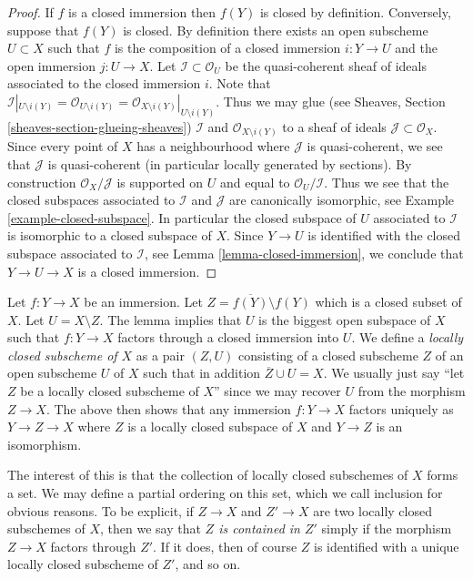 \begin{proof}
If $f$ is a closed immersion then $f(Y)$ is closed by definition.
Conversely, suppose that $f(Y)$ is closed. By definition
there exists an open subscheme $U \subset X$ such that $f$ is the composition
of a closed immersion $i : Y \to U$ and the open immersion
$j : U \to X$. Let $\mathcal{I} \subset \mathcal{O}_U$ be the
quasi-coherent sheaf of ideals associated to the closed immersion
$i$. Note that
$\mathcal{I}|_{U \setminus i(Y)}
= \mathcal{O}_{U \setminus i(Y)}
= \mathcal{O}_{X \setminus i(Y)}|_{U \setminus i(Y)}$.
Thus we may glue (see Sheaves, Section \ref{sheaves-section-glueing-sheaves})
$\mathcal{I}$ and $\mathcal{O}_{X \setminus i(Y)}$ to a sheaf of
ideals $\mathcal{J} \subset \mathcal{O}_X$. Since every
point of $X$ has a neighbourhood where $\mathcal{J}$ is
quasi-coherent, we see that $\mathcal{J}$ is quasi-coherent
(in particular locally generated by sections).
By construction $\mathcal{O}_X/\mathcal{J}$ is supported
on $U$ and equal to $\mathcal{O}_U/\mathcal{I}$.
Thus we see that the closed subspaces associated to $\mathcal{I}$
and $\mathcal{J}$ are canonically isomorphic, see
Example \ref{example-closed-subspace}.
In particular the closed subspace of $U$ associated to $\mathcal{I}$
is isomorphic to a closed subspace of $X$.
Since $Y \to U$ is identified with the closed subspace
associated to $\mathcal{I}$, see Lemma \ref{lemma-closed-immersion},
we conclude that $Y \to U \to X$
is a closed immersion.
\end{proof}

\noindent
Let $f : Y \to X$ be an immersion.
Let $Z = \overline{f(Y)} \setminus f(Y)$ which is a closed subset of $X$.
Let $U = X \setminus Z$.
The lemma implies that $U$ is the biggest open subspace of $X$
such that $f : Y \to X$ factors through a closed immersion into $U$.
We define a {\it locally closed subscheme of $X$} as a pair
$(Z, U)$ consisting of a closed subscheme $Z$ of an open subscheme $U$
of $X$ such that in addition $\overline{Z} \cup U = X$. We usually
just say ``let $Z$ be a locally closed subscheme of $X$'' since we may
recover $U$ from the morphism $Z \to X$. The above
then shows that any immersion $f : Y \to X$ factors uniquely
as $Y \to Z \to X$ where $Z$ is a locally closed subspace of $X$
and $Y \to Z$ is an isomorphism.

\medskip\noindent
The interest of this is that the collection of locally closed subschemes
of $X$ forms a set. We may define a partial ordering on this set,
which we call inclusion for obvious reasons. To be explicit, if
$Z \to X$ and $Z' \to X$ are two locally closed subschemes of $X$, then
we say that {\it $Z$ is contained in $Z'$} simply if the morphism
$Z \to X$ factors through $Z'$. If it does, then of course $Z$ is identified
with a unique locally closed subscheme of $Z'$, and so on.











